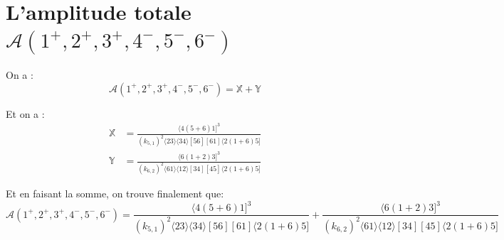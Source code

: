 \documentclass[12pt, a4paper]{article}
\begin{document}
		\section{L'amplitude totale $\mathcal{A}(1^+, 2^+, 3^+, 4^-, 5^-, 6^-)$}
		
		On a : 
		\[\mathcal{A}(1^+, 2^+, 3^+, 4^-, 5^-, 6^-)=\mathbb{X} + \mathbb{Y}\]
		
		Et on a :
		\begin{equation}
			\begin{split}
				\mathbb{X}
				&=\frac{\langle 4(5+6)1]^3 }{(k_{5,1})^2  \langle 23 \rangle \langle 34 \rangle [56][61]\langle 2(1+6)5]}\\
				\mathbb{Y}
				&=\frac{\langle 6(1+2)3]^3}{(k_{6,2})^2 \langle 61 \rangle \langle 12 \rangle [34][45]\langle 2 (1+6) 5]}
			\end{split}
		\end{equation}
		
		Et en faisant la somme, on trouve finalement que:
		\[\mathcal{A}(1^+, 2^+, 3^+, 4^-, 5^-, 6^-)=
		\frac{\langle 4(5+6)1]^3 }{(k_{5,1})^2  \langle 23 \rangle \langle 34 \rangle [56][61]\langle 2(1+6)5]}
		+
		\frac{\langle 6(1+2)3]^3}{(k_{6,2})^2 \langle 61 \rangle \langle 12 \rangle [34][45]\langle 2 (1+6) 5]}\]
		
		
		
\end{document}
